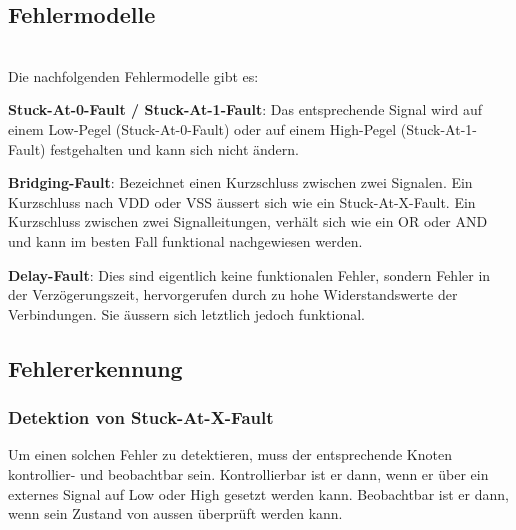 \subsection{Fehlermodelle}$~$ \\
Die nachfolgenden Fehlermodelle gibt es:
\begin{compactitem}
    \item \textbf{Stuck-At-0-Fault / Stuck-At-1-Fault}: Das entsprechende Signal wird auf einem Low-Pegel (Stuck-At-0-Fault) oder auf einem High-Pegel (Stuck-At-1-Fault) festgehalten und kann sich nicht ändern.
    \item \textbf{Bridging-Fault}: Bezeichnet einen Kurzschluss zwischen zwei Signalen. Ein Kurzschluss nach VDD oder VSS äussert sich wie ein Stuck-At-X-Fault. Ein Kurzschluss zwischen zwei Signalleitungen, verhält sich wie ein OR oder AND und kann im besten Fall funktional nachgewiesen werden.
    \item \textbf{Delay-Fault}: Dies sind eigentlich keine funktionalen Fehler, sondern Fehler in der Verzögerungszeit, hervorgerufen durch zu hohe Widerstandswerte der Verbindungen. Sie äussern sich letztlich jedoch funktional.
\end{compactitem}

\subsection{Fehlererkennung}
\subsubsection{Detektion von Stuck-At-X-Fault}
Um einen solchen Fehler zu detektieren, muss der entsprechende Knoten kontrollier- und beobachtbar sein. Kontrollierbar ist er dann, wenn er über ein externes Signal auf Low oder High gesetzt werden kann. Beobachtbar ist er dann, wenn sein Zustand von aussen überprüft werden kann.
